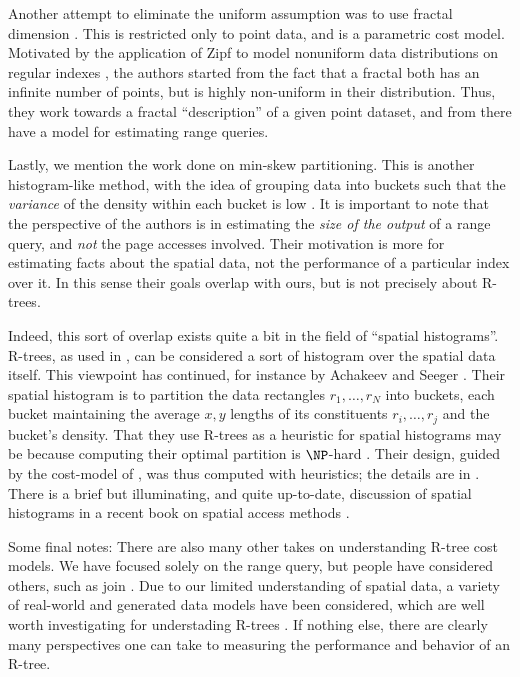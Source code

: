 Another attempt to eliminate the uniform assumption was to use fractal dimension \cite{faloutsoskamel94}. This is restricted only to point data, and is a parametric cost model. Motivated by the application of Zipf to model nonuniform data distributions on regular indexes \cite{ioannidischristodoulakis91}, the authors started from the fact that a fractal both has an infinite number of points, but is highly non-uniform in their distribution. Thus, they work towards a fractal ``description'' of a given point dataset, and from there have a model for estimating range queries.

Lastly, we mention the work done on min-skew partitioning.
This is another histogram-like method, with the idea of grouping data into buckets such that the \emph{variance} of the density within each bucket is low \cite{acharyapoosalaramaswamy99}.
It is important to note that the perspective of the authors is in estimating the \emph{size of the output} of a range query, and \emph{not} the page accesses involved.
Their motivation is more for estimating facts about the spatial data, not the performance of a particular index over it.
In this sense their goals overlap with ours, but is not precisely about R-trees.

Indeed, this sort of overlap exists quite a bit in the field of ``spatial histograms''.
R-trees, as used in \cite{acharyapoosalaramaswamy99}, can be considered a sort of histogram over the spatial data itself.
This viewpoint has continued, for instance by Achakeev and Seeger \cite{achakeevseeger12}.
Their spatial histogram is to partition the data rectangles $r_1,\ldots,r_N$ into buckets, each bucket maintaining the average $x,y$ lengths of its constituents $r_i,\ldots,r_j$ and the bucket's density.
That they use R-trees as a heuristic for spatial histograms may be because computing their optimal partition is $\NP$-hard \cite{muthukrishnanpoosalasuel99}.
Their design, guided by the cost-model of \cite{theodoridissellis96}, was thus computed with heuristics; the details are in \cite{achakeevseeger12a}.
There is a brief but illuminating, and quite up-to-date, discussion of spatial histograms in a recent book on spatial access methods \cite{mamoulis11}.

Some final notes:
There are also many other takes on understanding R-tree cost models.
We have focused solely on the range query, but people have considered others, such as join \cite{thebook,aboulnaganaughton00}.
Due to our limited understanding of spatial data, a variety of real-world and generated data models have been considered, which are well worth investigating for understading R-trees \cite{aboulnaganaughton00, anyangsivasubramaniam01, achakeevseeger12,achakeevseeger12a}.
If nothing else, there are clearly many perspectives one can take to measuring the performance and behavior of an R-tree.


